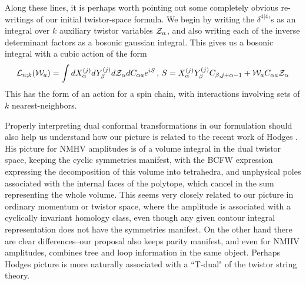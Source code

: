 \documentclass[12pt]{article}
\newcommand{\be}{\begin{eqnarray}}
\newcommand{\ee}{\end{eqnarray}}
\begin{document}
Along these lines, it is perhaps worth pointing out some completely obvious re-writings of our initial twistor-space formula. We begin by writing the $\delta^{4|4}$'s as an integral over $k$ auxiliary
twistor
variables ${\cal Z}_\alpha$, and also writing each of the inverse determinant factors as a bosonic gaussian integral.
This gives
us a bosonic integral with a cubic action of the form \be
{\cal L}_{n;k}({\cal W}_a) =
\int d X^{(j)}_{\alpha} dY^{(j)}_\beta d {\cal Z}_\alpha dC_{\alpha a} e^{iS} \, , \, S = X^{(j)}_\alpha Y^{(j)}_\beta
C_{\beta, j + \alpha - 1} + {\cal W}_a C_{\alpha a} {\cal Z}_\alpha
\ee
This has the form of an action for a spin chain, with interactions involving sets of $k$ nearest-neighbors.

Properly interpreting dual conformal transformations in our formulation should also help us understand how our picture is related to the recent work of Hodges \cite{Hodges:2009hk}. His picture for NMHV amplitudes is of a volume integral in the dual twistor space, keeping the cyclic symmetries manifest, with the BCFW expression expressing the decomposition of this volume into tetrahedra, and unphysical poles associated with the internal faces of the polytope, which cancel in the sum representing the whole volume.
This seems very closely related to our picture in ordinary momentum or twistor space, where the amplitude is associated with a cyclically invariant homology class, even though any given contour integral representation does not have the symmetries manifest. On the other hand there are clear differences--our proposal also keeps parity manifest, and even for NMHV amplitudes, combines tree and loop information in the same object. Perhaps Hodges picture is more naturally associated with a ``T-dual" of the twistor string theory.
\end{document}
